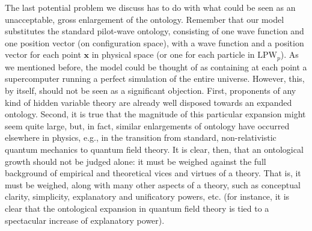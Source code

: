 \documentclass[letterpaper,12pt]{article}
\begin{document}
The last potential problem we discuss has to do with what could be seen as an unacceptable, gross enlargement of the ontology. Remember that our model substitutes the standard pilot-wave ontology, consisting of one wave function and one position vector (on configuration space), with a wave function and a position vector for each point $\mathbf{x}$ in physical space (or one for each particle in $\text{LPW}_p$). As we mentioned before, the model could be thought of as containing at each point a supercomputer running a perfect simulation of the entire universe. However, this, by itself, should not be seen as a significant objection. First, proponents of any kind of hidden variable theory are already well disposed towards an expanded ontology. Second, it is true that the magnitude of this particular expansion might seem quite large, but, in fact, similar enlargements of ontology have occurred elsewhere in physics, e.g., in the transition from standard, non-relativistic quantum mechanics to quantum field theory. It is clear, then, that an ontological growth should not be judged alone: it must be weighed against the full background of empirical and theoretical vices and virtues of a theory. That is, it must be weighed, along with many other aspects of a theory, such as conceptual clarity, simplicity, explanatory and unificatory powers, etc. (for instance, it is clear that the ontological expansion in quantum field theory is tied to a spectacular increase of explanatory power).
\end{document}
